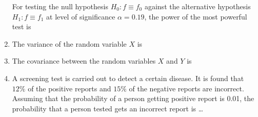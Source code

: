 \begin{enumerate}[label=\thesection.\arabic*.,ref=\thesection.\theenumi]
For testing the null hypothesis $H_0:f \equiv f_0$ against the alternative hypothesis $H_1:f \equiv f_1$ at level of significance $\alpha = 0.19$, the power of the most powerful test is

\begin{enumerate}
\end{enumerate}


\item The variance of the random variable $X$ is

\begin{enumerate}
\end{enumerate}


\item The covariance between the random variables $X$ and $Y$ is

\begin{enumerate}
\end{enumerate}


\item A screening test is carried out to detect a certain disease. It is found that $12\%$ of the positive
reports and $15\%$ of the negative reports are incorrect. Assuming that the probability of a
person getting positive report is 0.01, the probability that a person tested gets an incorrect
report is \dots
\\
\solution



\end{enumerate}
